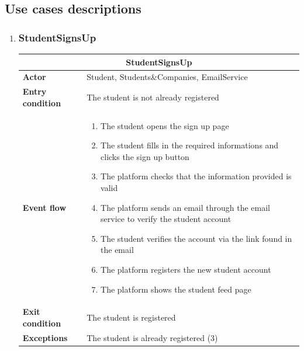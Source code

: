 \subsection{Use cases descriptions}

\begin{enumerate}[label=\textbf{UC\arabic* -}]

\item \subsubsection{StudentSignsUp}

\begin{table}[H]
    \centering
    \begin{tabular}{|l|m{10cm}|}
        \hline \multicolumn{2}{|c|}{\textbf{StudentSignsUp}} \\
        \hline \textbf{Actor} & Student, Students\&Companies, EmailService \\
        \hline \textbf{Entry condition} & The student is not already registered \\
        \hline \textbf{Event flow} &
            \begin{enumerate}[label=\arabic*]
                \item The student opens the sign up page
                \item The student fills in the required informations and clicks the sign up button
                \item The platform checks that the information provided is valid
                \item The platform sends an email through the email service to verify the student account
                \item The student verifies the account via the link found in the email
                \item The platform registers the new student account
                \item The platform shows the student feed page
            \end{enumerate} \\
        \hline \textbf{Exit condition} & The student is registered \\
        \hline \textbf{Exceptions} & The student is already registered (3) \\
        \hline
    \end{tabular}
\end{table}


\end{enumerate}
